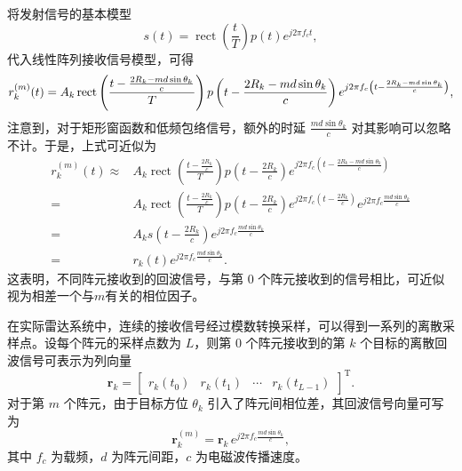 将发射信号的基本模型
\[
    s(t) = \operatorname{rect}\left(\frac{t}{T}\right) p(t) e^{j 2 \pi f_c t},
\]
代入线性阵列接收信号模型，可得
\[
    \small
    r_k^{(m)}(t) = A_k \operatorname{rect}\left(\frac{t - \frac{2 R_k - m d \sin\theta_k}{c}}{T}\right)
    p\left(t - \frac{2 R_k - m d \sin\theta_k}{c}\right)
    e^{j 2 \pi f_c \left(t - \frac{2 R_k - m d \sin\theta_k}{c}\right)},
\]
注意到，对于矩形窗函数和低频包络信号，额外的时延 $\frac{m d \sin\theta_k}{c}$ 对其影响可以忽略不计。于是，上式可近似为
\[
    \begin{split}
        r_k^{(m)}(t) \approx & A_k \operatorname{rect}\left(\frac{t - \frac{2 R_k}{c}}{T}\right)
        p\left(t - \frac{2 R_k}{c}\right)
        e^{j 2 \pi f_c \left(t - \frac{2 R_k - m d \sin\theta_k}{c}\right)}                      \\
        =                    & A_k \operatorname{rect}\left(\frac{t - \frac{2 R_k}{c}}{T}\right)
        p\left(t - \frac{2 R_k}{c}\right)
        e^{j 2 \pi f_c \left(t - \frac{2 R_k}{c}\right)}
        e^{j 2 \pi f_c \frac{m d \sin\theta_k}{c}}                                               \\
        =                    & A_k s\left(t - \frac{2 R_k}{c}\right)
        e^{j 2 \pi f_c \frac{m d \sin\theta_k}{c}}                                               \\
        =                    & r_k(t) e^{j 2 \pi f_c \frac{m d \sin\theta_k}{c}}.
    \end{split}
\]
这表明，不同阵元接收到的回波信号，与第 0 个阵元接收到的信号相比，可近似视为相差一个与\( m \)有关的相位因子。

在实际雷达系统中，连续的接收信号经过模数转换采样，可以得到一系列的离散采样点。设每个阵元的采样点数为 \(L\)，则第 \(0\) 个阵元接收到的第 \(k\) 个目标的离散回波信号可表示为列向量
\[
    \bm{r}_k =
    \begin{bmatrix}
        r_k(t_0) & r_k(t_1) & \cdots & r_k(t_{L-1})
    \end{bmatrix}^{\mathrm{T}}.
\]
对于第 \(m\) 个阵元，由于目标方位 \(\theta_k\) 引入了阵元间相位差，其回波信号向量可写为
\[
    \bm{r}^{(m)}_k
    = \bm{r}_k \, e^{j 2 \pi f_c \frac{m d \sin\theta_k}{c}},
\]
其中 \(f_c\) 为载频，\(d\) 为阵元间距，\(c\) 为电磁波传播速度。


